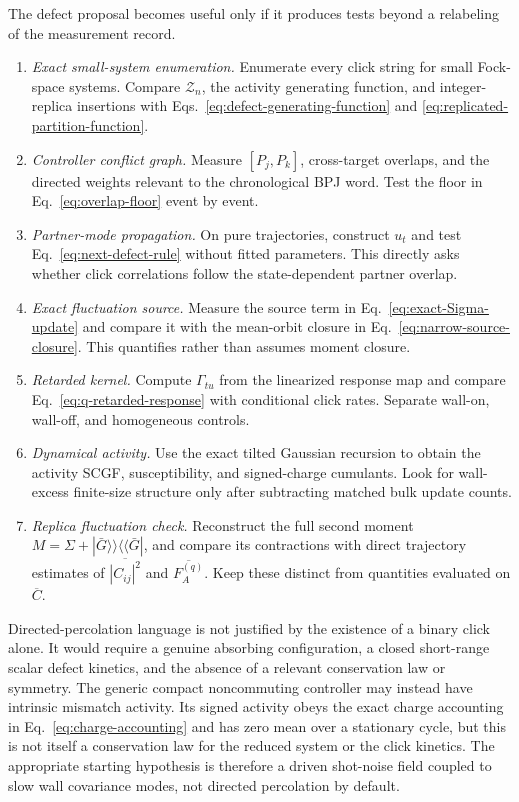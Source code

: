 \documentclass[
  aps,prx,twocolumn,superscriptaddress,longbibliography,
  nofootinbib,floatfix
]{revtex4-2}
\newcommand{\cZ}{\mathcal{Z}}
\newcommand{\avg}[1]{\overline{#1}}
\theoremstyle{plain}
\theoremstyle{definition}
\begin{document}
The defect proposal becomes useful only if it produces tests beyond a relabeling
of the measurement record.
\begin{enumerate}
 \item \emph{Exact small-system enumeration.}  Enumerate every click string for
 small Fock-space systems.  Compare \(\cZ_n\), the activity generating
 function, and integer-replica insertions with
 Eqs.~\eqref{eq:defect-generating-function} and
 \eqref{eq:replicated-partition-function}.
 \item \emph{Controller conflict graph.}  Measure
 \([P_j,P_k]\), cross-target overlaps, and the directed weights relevant to
 the chronological BPJ word.  Test the floor in Eq.~\eqref{eq:overlap-floor}
 event by event.
 \item \emph{Partner-mode propagation.}  On pure trajectories, construct
 \(u_t\) and test Eq.~\eqref{eq:next-defect-rule} without fitted parameters.
 This directly asks whether click correlations follow the state-dependent
 partner overlap.
 \item \emph{Exact fluctuation source.}  Measure the source term in
 Eq.~\eqref{eq:exact-Sigma-update} and compare it with the mean-orbit closure
 in Eq.~\eqref{eq:narrow-source-closure}.  This quantifies rather than assumes
 moment closure.
 \item \emph{Retarded kernel.}  Compute \(\Gamma_{tu}\) from the linearized
 response map and compare Eq.~\eqref{eq:q-retarded-response} with conditional
 click rates.  Separate wall-on, wall-off, and homogeneous controls.
 \item \emph{Dynamical activity.}  Use the exact tilted Gaussian recursion to
 obtain the activity SCGF, susceptibility, and signed-charge cumulants.  Look
 for wall-excess finite-size structure only after subtracting matched bulk
 update counts.
 \item \emph{Replica fluctuation check.}  Reconstruct the full second moment
 \(M=\Sigma+|\bar G\rangle\!\rangle\langle\!\langle\bar G|\), and compare its
 contractions with direct trajectory estimates of \(\avg{|C_{ij}|^2}\) and
 \(\avg{F_A^{(q)}}\).  Keep these distinct from quantities evaluated on
 \(\avg C\).
\end{enumerate}

Directed-percolation language is not justified by the existence of a binary
click alone.  It would require a genuine absorbing configuration, a closed
short-range scalar defect kinetics, and the absence of a relevant conservation
law or symmetry.  The generic compact noncommuting controller may instead have
intrinsic mismatch activity.  Its signed activity obeys the exact charge
accounting in Eq.~\eqref{eq:charge-accounting} and has zero mean over a
stationary cycle, but this is not itself a conservation law for the reduced
system or the click kinetics.  The appropriate starting hypothesis is
therefore a driven shot-noise field coupled to slow wall covariance modes, not
directed percolation by default.
\end{document}
